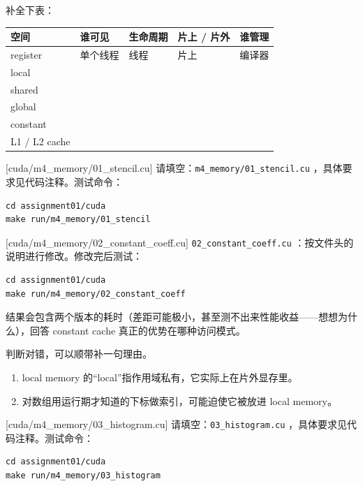 \documentclass[11pt,a4paper,fontset=none]{ctexart}
\begin{document}
补全下表：

\begin{center}\small
\begin{tabular}{@{}lp{8em}p{7em}p{6em}p{8em}@{}}
\toprule
空间 & 谁可见 & 生命周期 & 片上 / 片外 & 谁管理 \\
\midrule
register & 单个线程 & 线程 & 片上 & 编译器 \\
local &  &  &  &  \\
shared &  &  &  &  \\
global &  &  &  &  \\
constant &  &  &  &  \\
L1 / L2 cache &  &  &  &  \\
\bottomrule
\end{tabular}
\end{center}

[cuda/m4\_memory/01\_stencil.cu]
请填空：\texttt{m4\_memory/01\_stencil.cu} ，具体要求见代码注释。测试命令：

\begin{lstlisting}
cd assignment01/cuda
make run/m4_memory/01_stencil
\end{lstlisting}

[cuda/m4\_memory/02\_constant\_coeff.cu]
\texttt{02\_constant\_coeff.cu} ：按文件头的说明进行修改。修改完后测试：

\begin{lstlisting}
cd assignment01/cuda
make run/m4_memory/02_constant_coeff
\end{lstlisting}

结果会包含两个版本的耗时（差距可能极小，甚至测不出来性能收益——想想为什么），回答 constant cache 真正的优势在哪种访问模式。

判断对错，可以顺带补一句理由。
\begin{enumerate}[label=(\alph*)]
  \item local memory 的“local”指作用域私有，它实际上在片外显存里。
  \item 对数组用运行期才知道的下标做索引，可能迫使它被放进 local memory。
\end{enumerate}

[cuda/m4\_memory/03\_histogram.cu]
请填空：\texttt{03\_histogram.cu} ，具体要求见代码注释。测试命令：

\begin{lstlisting}
cd assignment01/cuda
make run/m4_memory/03_histogram
\end{lstlisting}
\end{document}
